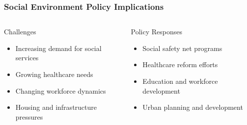 \documentclass[10pt]{beamer}
\begin{document}
\begin{frame}
\frametitle{Social Environment Policy Implications}

\begin{columns}
\begin{column}{0.48\textwidth}
\begin{block}{Challenges}
\pause
\begin{itemize}
\item Increasing demand for social services
\item Growing healthcare needs
\item Changing workforce dynamics
\item Housing and infrastructure pressures
\end{itemize}
\end{block}
\end{column}

\begin{column}{0.48\textwidth}
\begin{block}{Policy Responses}
\pause
\begin{itemize}
\item Social safety net programs
\item Healthcare reform efforts
\item Education and workforce development
\item Urban planning and development
\end{itemize}
\end{block}
\end{column}
\end{columns}

\end{frame}
\end{document}

